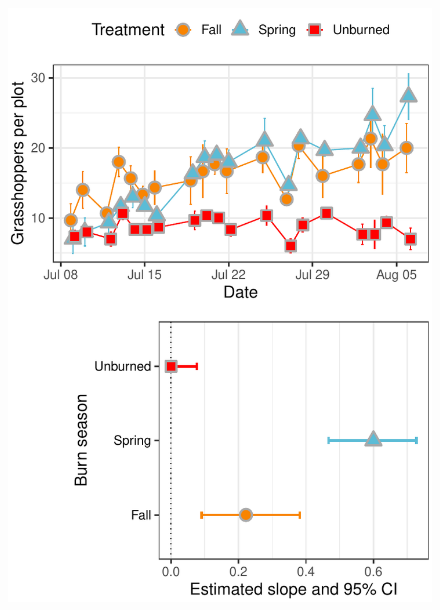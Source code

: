 \documentclass[referee, 
	            sn-basic]
           {sn-jnl}
\begin{document}
\begin{figure}
	\centering
	\includegraphics{tau_gg-1.pdf}
	\caption{ } %
	\label{tau} %
\end{figure}

\end{document}
